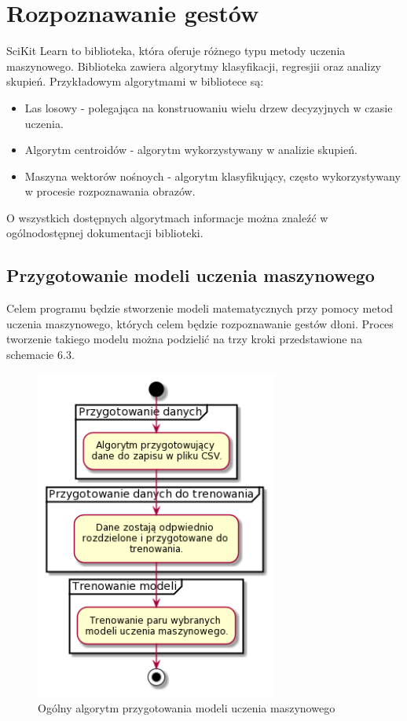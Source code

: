 
\section{Rozpoznawanie gestów}

\quad SciKit Learn to biblioteka, która oferuje różnego typu metody uczenia maszynowego. Biblioteka zawiera algorytmy klasyfikacji, regresjii oraz analizy skupień. Przykładowym algorytmami w bibliotece są:
\begin{itemize}
    \item Las losowy - polegająca na konstruowaniu wielu drzew decyzyjnych w czasie uczenia. 
    \item Algorytm centroidów - algorytm wykorzystywany w analizie skupień.
    \item Maszyna wektorów nośnoych - algorytm klasyfikujący, często wykorzystywany w procesie rozpoznawania obrazów. 
\end{itemize}
O wszystkich dostępnych algorytmach informacje można znaleźć w ogólnodostępnej dokumentacji biblioteki. 

\subsection{Przygotowanie modeli uczenia maszynowego}
\quad Celem programu będzie stworzenie modeli matematycznych przy pomocy metod uczenia maszynowego, których celem będzie rozpoznawanie gestów dłoni. Proces tworzenie takiego modelu można podzielić na trzy kroki przedstawione na schemacie 6.3. 

\begin{figure}[H]
    \begin{center}
        \includegraphics[width=8cm]{../images/full_algorithm.png}
        \caption{Ogólny algorytm przygotowania modeli uczenia maszynowego}
    \end{center}
\end{figure}

